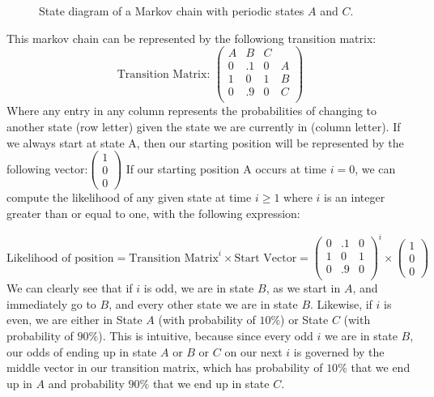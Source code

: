 \documentclass[12pt,twoside]{article}
\begin{document}
\begin{enumerate}
\begin{figure}[h]
\begin{center}
\end{center}
\caption{State diagram of a Markov chain with periodic states $A$ and $C$.}
\label{fig:periodic}
\end{figure} 
\subitem
This markov chain can be represented by the followiong transition matrix:
$$ \text{Transition Matrix: }
    \begin{pmatrix}
    A & B & C & \ \\
    0 & .1 & 0 & A\\
    1 & 0 & 1 & B\\
    0 & .9 & 0 & C\\
    \end{pmatrix}
$$
Where any entry in any column represents the probabilities of changing to another state (row letter) given the state we are currently in (column letter). If we always start at state A, then our starting position will be represented by the following vector:$
    \begin{pmatrix}
    1 \\
    0 \\
    0 
    \end{pmatrix}
$
If our starting position A occurs at time $i=0$, we can compute the likelihood of any given state at time $i\geq 1$ where $i$ is an integer greater than or equal to one, with the following expression:

$$
    \text{Likelihood of position} = \text{Transition Matrix}^i \times \text{Start Vector} =  \begin{pmatrix}
    0 & .1 & 0 \\
    1 & 0 & 1 \\
    0 & .9 & 0\\
    \end{pmatrix}^i \times \begin{pmatrix}
    1 \\
    0 \\
    0 
    \end{pmatrix}
$$
We can clearly see that if $i$ is odd, we are in state $B$, as we start in $A$, and immediately go to $B$, and every other state we are in state $B$. Likewise, if $i$ is even, we are either in State $A$ (with probability of $10\%$) or State $C$ (with probability of $90\%$). This is intuitive, because since every odd $i$ we are in state $B$, our odds of ending up in state $A$ or $B$ or $C$ on our next $i$ is governed by the middle vector in our transition matrix, which has probability of $10\%$ that we end up in $A$ and probability $90\%$ that we end up in state $C$.


\end{enumerate}
\end{document}
